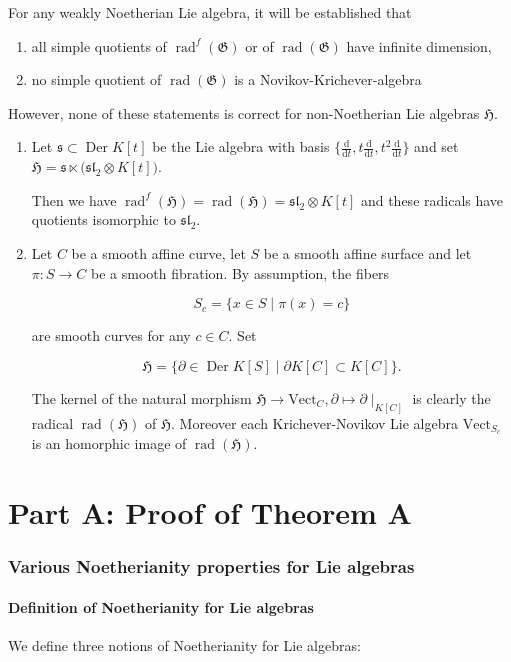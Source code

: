 \documentclass[11pt, letterpaper, reqno]{amsart}
\theoremstyle{definition}
\newcommand{\Der}{\operatorname{Der}}
\newcommand{\rad}{\operatorname{rad}}
\newcommand{\fsl}{\mathfrak{sl}}
\newcommand{\fH}{\mathfrak{H}}
\newcommand{\fs}{\mathfrak{s}}
\newcommand{\fG}{\mathfrak{G}}
\newcommand{\Vect}{\mathrm{Vect}}
\renewcommand{\d}{\mathrm{d}}
\begin{document}
For any weakly Noetherian Lie algebra, it will  be established that 
\begin{enumerate}
\item[(a)] all simple quotients of
$\rad^f(\fG)$ or of $\rad(\fG)$ have infinite dimension,
\item[(b)] no simple quotient of
$\rad(\fG)$  is a Novikov-Krichever-algebra
\end{enumerate}

However, none of these statements is correct for 
non-Noetherian  Lie algebras $\fH$.

\begin{enumerate}
\item[(a)] Let $\fs\subset \Der K[t]$ be the Lie algebra with
basis $\{\frac{\d}{\d t}, t\frac{\d}{\d t}, 
t^2\frac{\d}{\d t}\}$ and set
$\fH=\fs\ltimes \big(\fsl_2\otimes K[t]\big)$.

Then we have $\rad^f(\fH)=\rad(\fH)= \fsl_2\otimes K[t]$
and these radicals have  quotients isomorphic to 
 $\fsl_2$.

\item[(b)] Let $C$ be a smooth affine curve, let $S$ be a smooth
affine surface and let $\pi:S\to C$ be a smooth fibration.
By assumption, the fibers

$$S_c=\{x\in S\mid \pi(x)=c\}$$ 

\noindent are smooth curves for any $c\in C$.
Set 

$$\fH=\{\partial\in \Der K[S]\mid \partial K[C]\subset K[C]\}.$$

The kernel of the natural morphism 
$\fH\to\Vect_C, \partial\mapsto \partial\mid_{K[C]}$ is clearly 
the radical $\rad(\fH)$ of $\fH$. Moreover each
Krichever-Novikov Lie algebra $\Vect_{S_c}$ is an homorphic image of
$\rad(\fH)$.
\end{enumerate}








\part*{\hskip35mm Part A: Proof of Theorem A}

\section{Various Noetherianity properties for Lie algebras}\label{Noetherianity}

\subsection{Definition of Noetherianity for Lie algebras}
We define three notions of Noetherianity for Lie algebras:
\end{document}
